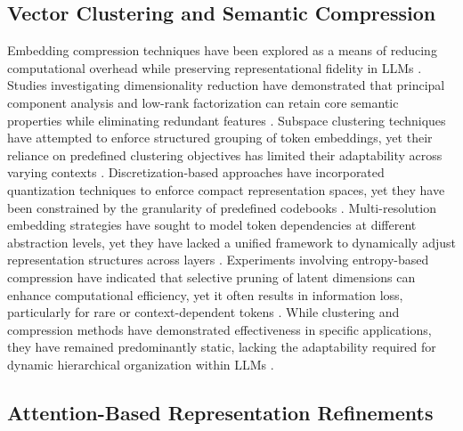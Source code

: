 \documentclass[5p,times]{elsarticle}
\begin{document}
\subsection{Vector Clustering and Semantic Compression}

Embedding compression techniques have been explored as a means of reducing computational overhead while preserving representational fidelity in LLMs \cite{hartsuikerfinetuning}. Studies investigating dimensionality reduction have demonstrated that principal component analysis and low-rank factorization can retain core semantic properties while eliminating redundant features \cite{satterfield2024fine}. Subspace clustering techniques have attempted to enforce structured grouping of token embeddings, yet their reliance on predefined clustering objectives has limited their adaptability across varying contexts \cite{racus2024dynamic}. Discretization-based approaches have incorporated quantization techniques to enforce compact representation spaces, yet they have been constrained by the granularity of predefined codebooks \cite{potkins2024improve}. Multi-resolution embedding strategies have sought to model token dependencies at different abstraction levels, yet they have lacked a unified framework to dynamically adjust representation structures across layers \cite{eamen2024neural}. Experiments involving entropy-based compression have indicated that selective pruning of latent dimensions can enhance computational efficiency, yet it often results in information loss, particularly for rare or context-dependent tokens \cite{mcintosh2024inadequacies}. While clustering and compression methods have demonstrated effectiveness in specific applications, they have remained predominantly static, lacking the adaptability required for dynamic hierarchical organization within LLMs \cite{zahedi2024conversational}.

\subsection{Attention-Based Representation Refinements}
\end{document}
